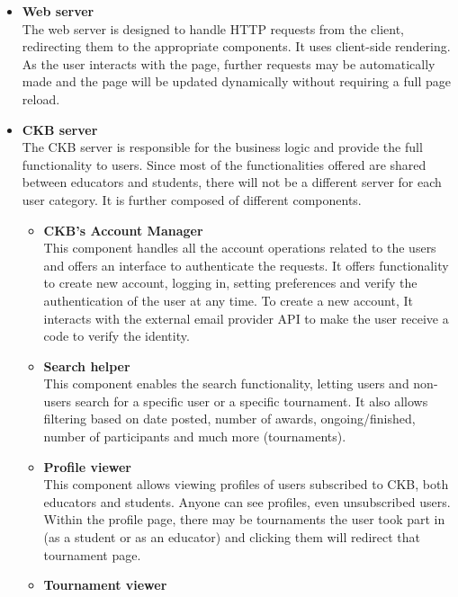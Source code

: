 \begin{itemize}
    \item \textbf{Web server}\\
    The web server is designed to handle HTTP requests from the client, redirecting them to the appropriate components. It uses client-side rendering. As the user interacts with the page, further requests may be automatically made and the page will be updated dynamically without requiring a full page reload.\\
    \item \textbf{CKB server}\\
    The CKB server is responsible for the business logic and provide the full functionality to users. Since most of the functionalities offered are shared between educators and students, there will not be a different server for each user category. It is further composed of different components.\\
    \begin{itemize}
        \item \textbf{CKB’s Account Manager}\\
        This component handles all the account operations related to the users and offers an interface to authenticate the requests. It offers functionality to create new account, logging in, setting preferences and verify the authentication of the user at any time. To create a new account, It interacts with the external email provider API to make the user receive a code to verify the identity.\\
        \item \textbf{Search helper}\\
        This component enables the search functionality, letting users and non-users search for a specific user or a specific tournament. It also allows filtering based on date posted, number of awards, ongoing/finished, number of participants and much more (tournaments).\\
        \item \textbf{Profile viewer}\\
        This component allows viewing profiles of users subscribed to CKB, both educators and students. Anyone can see profiles, even unsubscribed users. Within the profile page, there may be tournaments the user took part in (as a student or as an educator) and clicking them will redirect that tournament page.\\
        \item \textbf{Tournament viewer}\\

\end{itemize}
\end{itemize}
